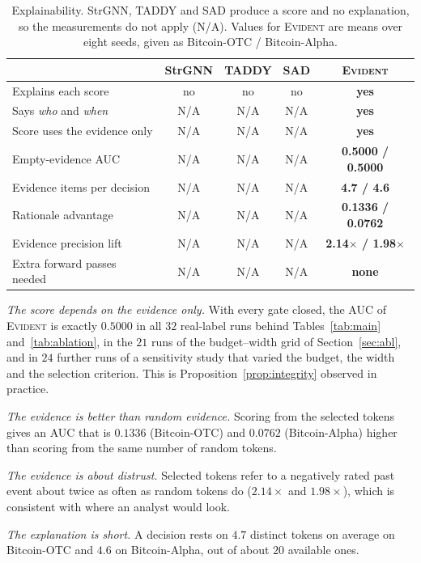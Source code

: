 \documentclass[pdflatex,sn-basic]{sn-jnl}
\newcommand{\evident}{\textsc{Evident}}
\newcommand{\na}{\textcolor{evgray}{N/A}}
\theoremstyle{definition}
\theoremstyle{plain}
\begin{document}
\begin{table}[!t]
\caption{Explainability. StrGNN, TADDY and SAD produce a score and no
explanation, so the measurements do not apply (\na). Values for \evident{} are
means over eight seeds, given as Bitcoin-OTC / Bitcoin-Alpha.}
\label{tab:explain}
\centering
\footnotesize
\setlength{\tabcolsep}{3.4pt}
\renewcommand{\arraystretch}{1.18}
\begin{tabular}{@{}lcccc@{}}
\toprule
 & StrGNN & TADDY & SAD & \textbf{\evident{}}\\
\midrule
Explains each score & no & no & no & \textbf{yes}\\
Says \emph{who} and \emph{when} & \na & \na & \na & \textbf{yes}\\
Score uses the evidence only & \na & \na & \na & \textbf{yes}\\
Empty-evidence AUC & \na & \na & \na & \textbf{0.5000 / 0.5000}\\
Evidence items per decision & \na & \na & \na & \textbf{4.7 / 4.6}\\
Rationale advantage & \na & \na & \na & \textbf{0.1336 / 0.0762}\\
Evidence precision lift & \na & \na & \na & \textbf{2.14$\times$ / 1.98$\times$}\\
Extra forward passes needed & \na & \na & \na & \textbf{none}\\
\bottomrule
\end{tabular}
\end{table}

\emph{The score depends on the evidence only.} With every gate closed, the AUC
of \evident{} is exactly $0.5000$ in all $32$ real-label runs behind
Tables~\ref{tab:main} and~\ref{tab:ablation}, in the $21$ runs of the
budget--width grid of Section~\ref{sec:abl}, and in $24$ further runs of a
sensitivity study that varied the budget, the width and the selection
criterion.
This is Proposition~\ref{prop:integrity} observed in practice.

\emph{The evidence is better than random evidence.} Scoring from the selected
tokens gives an AUC that is $0.1336$ (Bitcoin-OTC) and $0.0762$
(Bitcoin-Alpha) higher than scoring from the same number of random tokens.

\emph{The evidence is about distrust.} Selected tokens refer to a negatively
rated past event about twice as often as random tokens do ($2.14\times$ and
$1.98\times$), which is consistent with where an analyst would look.

\emph{The explanation is short.} A decision rests on $4.7$ distinct tokens on
average on Bitcoin-OTC and $4.6$ on Bitcoin-Alpha, out of about $20$ available
ones.
\end{document}
